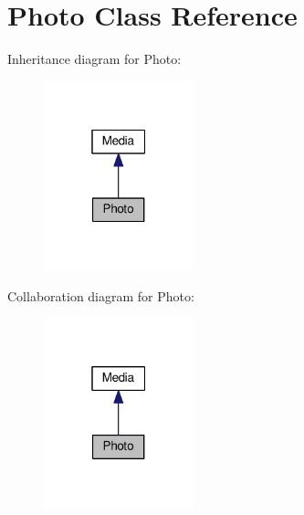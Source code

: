 \hypertarget{classPhoto}{}\section{Photo Class Reference}
\label{classPhoto}


Inheritance diagram for Photo\+:\nopagebreak
\begin{figure}[H]
\begin{center}
\leavevmode
\includegraphics[width=123pt]{classPhoto__inherit__graph}
\end{center}
\end{figure}


Collaboration diagram for Photo\+:\nopagebreak
\begin{figure}[H]
\begin{center}
\leavevmode
\includegraphics[width=123pt]{classPhoto__coll__graph}
\end{center}
\end{figure}
